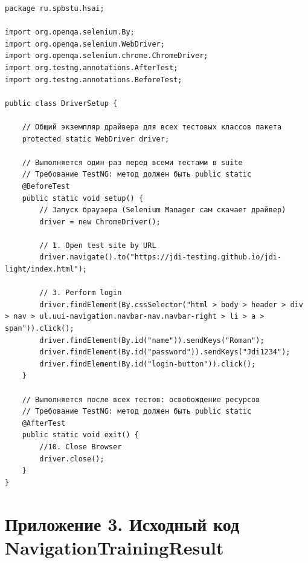 \documentclass{article}[14pt]
\begin{document}
\begin{lstlisting}
package ru.spbstu.hsai;

import org.openqa.selenium.By;
import org.openqa.selenium.WebDriver;
import org.openqa.selenium.chrome.ChromeDriver;
import org.testng.annotations.AfterTest;
import org.testng.annotations.BeforeTest;

public class DriverSetup {

    // Общий экземпляр драйвера для всех тестовых классов пакета
    protected static WebDriver driver;

    // Выполняется один раз перед всеми тестами в suite
    // Требование TestNG: метод должен быть public static
    @BeforeTest
    public static void setup() {
        // Запуск браузера (Selenium Manager сам скачает драйвер)
        driver = new ChromeDriver();

        // 1. Open test site by URL
        driver.navigate().to("https://jdi-testing.github.io/jdi-light/index.html");

        // 3. Perform login
        driver.findElement(By.cssSelector("html > body > header > div > nav > ul.uui-navigation.navbar-nav.navbar-right > li > a > span")).click();
        driver.findElement(By.id("name")).sendKeys("Roman");
        driver.findElement(By.id("password")).sendKeys("Jdi1234");
        driver.findElement(By.id("login-button")).click();
    }

    // Выполняется после всех тестов: освобождение ресурсов
    // Требование TestNG: метод должен быть public static
    @AfterTest
    public static void exit() {
        //10. Close Browser
        driver.close();
    }
}
\end{lstlisting}

\pagebreak

\section*{Приложение 3. Исходный код \\NavigationTrainingResult}
\end{document}
